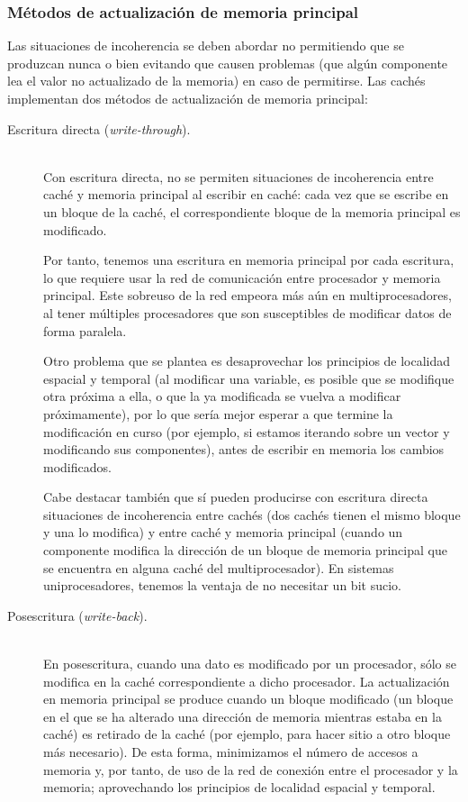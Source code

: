 \subsubsection{Métodos de actualización de memoria principal}
Las situaciones de incoherencia se deben abordar no permitiendo que se produzcan nunca o bien evitando que causen problemas (que algún componente lea el valor no actualizado de la memoria) en caso de permitirse. Las cachés implementan dos métodos de actualización de memoria principal:
\begin{description}
    \item [Escritura directa (\emph{write-through}).]~\\ 
        Con escritura directa, no se permiten situaciones de incoherencia entre caché y memoria principal al escribir en caché: cada vez que se escribe en un bloque de la caché, el correspondiente bloque de la memoria principal es modificado. 

        Por tanto, tenemos una escritura en memoria principal por cada escritura, lo que requiere usar la red de comunicación entre procesador y memoria principal. Este sobreuso de la red empeora más aún en multiprocesadores, al tener múltiples procesadores que son susceptibles de modificar datos de forma paralela.

        Otro problema que se plantea es desaprovechar los principios de localidad espacial y temporal (al modificar una variable, es posible que se modifique otra próxima a ella, o que la ya modificada se vuelva a modificar próximamente), por lo que sería mejor esperar a que termine la modificación en curso (por ejemplo, si estamos iterando sobre un vector y modificando sus componentes), antes de escribir en memoria los cambios modificados.

        Cabe destacar también que sí pueden producirse con escritura directa situaciones de incoherencia entre cachés (dos cachés tienen el mismo bloque y una lo modifica) y entre caché y memoria principal (cuando un componente modifica la dirección de un bloque de memoria principal que se encuentra en alguna caché del multiprocesador). En sistemas uniprocesadores, tenemos la ventaja de no necesitar un bit sucio.

    \item [Posescritura (\emph{write-back}).]~\\
        En posescritura, cuando una dato es modificado por un procesador, sólo se modifica en la caché correspondiente a dicho procesador. La actualización en memoria principal se produce cuando un bloque modificado (un bloque en el que se ha alterado una dirección de memoria mientras estaba en la caché) es retirado de la caché (por ejemplo, para hacer sitio a otro bloque más necesario). De esta forma, minimizamos el número de accesos a memoria y, por tanto, de uso de la red de conexión entre el procesador y la memoria; aprovechando los principios de localidad espacial y temporal.


\end{description}
